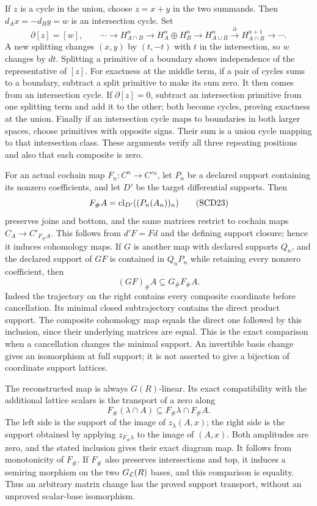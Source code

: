 \documentclass[11pt,a4paper]{article}
\theoremstyle{definition}\newtheorem{definition}[theorem]{Definition}
\begin{document}
If \(z\) is a cycle in the union, choose \(z=x+y\) in the two
summands. Then \(d_Ax=-d_By=w\) is an intersection cycle. Set
\[
 \partial[z]=[w],\qquad
 \cdots\to H_{A\cap B}^n\to H_A^n\oplus H_B^n
 \to H_{A\cup B}^n\xrightarrow{\partial}H_{A\cap B}^{n+1}\to\cdots .
 \tag{SCD22}
\]
A new splitting changes \((x,y)\) by \((t,-t)\) with \(t\) in
the intersection, so \(w\) changes by \(dt\). Splitting a primitive
of a boundary shows independence of the representative of \([z]\).
For exactness at the middle term, if a pair of cycles sums to a
boundary, subtract a split primitive to make its sum zero. It then
comes from an intersection cycle. If \(\partial[z]=0\), subtract
an intersection primitive from one splitting term and add it to
the other; both become cycles, proving exactness at the union.
Finally if an intersection cycle maps to boundaries in both larger
spaces, choose primitives with opposite signs. Their sum is a union
cycle mapping to that intersection class. These arguments verify
all three repeating positions and also that each composite is zero.

For an actual cochain map \(F_n:C^n\to C'{}^n\), let \(P_n\)
be a declared support containing its nonzero coefficients, and
let \(D'\) be the target differential supports. Then
\[
 F_\#A=\operatorname{cl}_{D'}((P_n(A_n))_n)
 \tag{SCD23}
\]
preserves joins and bottom, and the same matrices restrict to
cochain maps \(C_A\to C'_{F_\#A}\). This follows from \(d'F=Fd\)
and the defining support closure; hence it induces cohomology maps.
If \(G\) is another map with declared supports \(Q_n\), and the
declared support of \(GF\) is contained in \(Q_nP_n\) while retaining
every nonzero coefficient, then
\[
 (GF)_\#A\subseteq G_\#F_\#A .
 \tag{SCD24}
\]
Indeed the trajectory on the right contains every composite
coordinate before cancellation. Its minimal closed subtrajectory
contains the direct product support. The composite cohomology map
equals the direct one followed by this inclusion, since their
underlying matrices are equal. This is the exact comparison when
a cancellation changes the minimal support. An invertible basis
change gives an isomorphism at full support; it is not asserted
to give a bijection of coordinate support lattices.

The reconstructed map is always \(G(R)\)-linear. Its exact
compatibility with the additional lattice scalars is the transport
of a zero along
\[
 F_\#(\lambda\cap A)\subseteq F_\#\lambda\cap F_\#A.
\]
The left side is the support of the image of \(z_\lambda(A,x)\);
the right side is the support obtained by applying
\(z_{F_\#\lambda}\) to the image of \((A,x)\). Both amplitudes
are zero, and the stated inclusion gives their exact diagram map.
It follows from monotonicity of \(F_\#\). If \(F_\#\) also
preserves intersections and top, it induces a semiring morphism
on the two \(G_{\mathcal L}(R)\) bases, and this comparison is equality.
Thus an arbitrary matrix change has the proved support transport,
without an unproved scalar-base isomorphism.
\end{document}
